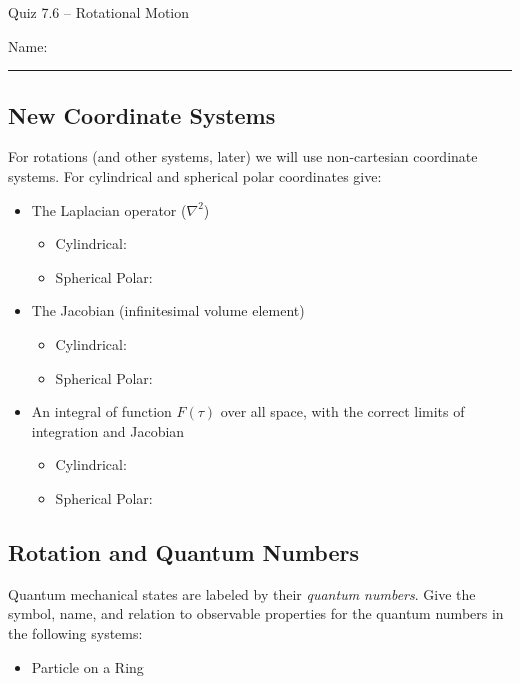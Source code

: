 \documentclass[11pt, letterpaper]{memoir}
\begin{document}
	\begin{center}
		{\large Quiz 7.6 --	Rotational Motion}
	\end{center}
	{\large Name: \rule[-1mm]{4in}{.1pt} 

\subsection*{New Coordinate Systems}
For rotations (and other systems, later) we will use non-cartesian coordinate systems. For cylindrical and spherical polar coordinates give:
\begin{itemize}
	\item The Laplacian operator ($\nabla^2$)
	\begin{itemize}
		\item Cylindrical:
		
		\vspace{2em}
		\item Spherical Polar:
	\end{itemize}
	
	\vspace{2em}
	\item The Jacobian (infinitesimal volume element)
	\begin{itemize}
		\item Cylindrical:
		
		\vspace{2em}
		\item Spherical Polar:
	\end{itemize}
	
	\vspace{2em}
	\item An integral of function $F(\tau)$ over all space, with the correct limits of integration and Jacobian
	\begin{itemize}
		\item Cylindrical:
		
		\vspace{2em}
		\item Spherical Polar:
	\end{itemize}
\end{itemize}

\vspace{2em}

\subsection*{Rotation and Quantum Numbers}
Quantum mechanical states are labeled by their \emph{quantum numbers}. Give the symbol, name, and relation to observable properties for the quantum numbers in the following systems:
\begin{itemize}
	\item Particle on a Ring
	

\end{itemize}}
\end{document}

